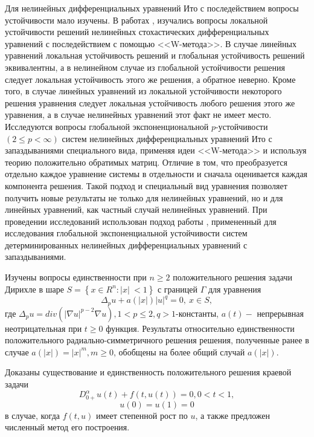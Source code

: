 Для нелинейных дифференциальных уравнений Ито с последействием
вопросы устойчивости мало изучены. В работах \cite{kad5}, \cite{kad6} изучались
вопросы локальной устойчивости решений нелинейных стохастических
дифференциальных уравнений с последействием с помощью <<W-метода>>. В
случае линейных уравнений локальная устойчивость решений и
глобальная устойчивость решений эквивалентны, а в нелинейном случае
из глобальной устойчивости решения следует локальная устойчивость
этого же решения, а обратное неверно. Кроме того, в случае линейных
уравнений из локальной устойчивости некоторого решения уравнения
следует локальная устойчивость любого решения этого же уравнения, а в
случае нелинейных уравнений этот факт не имеет место.
Исследуются вопросы  глобальной
экспоненциональной $p$-устойчи\-вос\-ти $(2 \le p < \infty )$ систем
нелинейных дифференциальных уравнений Ито с запаздываниями
специального вида, применяя идеи <<W-метода>> и  используя теорию
положительно обратимых матриц. Отличие в том, что преобразуется
отдельно каждое уравнение системы в отдельности и сначала
оценивается каждая компонента решения. Такой подход и специальный
вид уравнения позволяет получить новые результаты не только для
нелинейных уравнений, но и для линейных уравнений, как частный
случай нелинейных уравнений. При проведении исследований использован
подход работы \cite{kad7}, примененный для исследования глобальной
экспоненциальной устойчивости систем детерминированных нелинейных
дифференциальных уравнений с запаздываниями.



Изучены вопросы единственности при $ n \geq 2$ положительного решения задачи Дирихле
в шаре
$ S=\left\{x\in R^n:\vert x \vert\ < 1 \right\} $
с границей $\Gamma $
для уравнения
$$
\Delta_{p} u+a(|x|){\vert u \vert}^q=0,\ x \in S,
$$
где $ \Delta_{p} u=div(\vert \nabla u\vert^{p-2}\nabla u),
1<p \le2, q>1 $-константы, $a(t)-$ непрерывная неотрицательная
при $t\geq 0 $ функция.
Результаты
относительно единственности положительного радиально-симметричного
решения решения, полученные ранее в случае
$a(|x|)=|x|^m, m\geq 0 $, обобщены на более общий случай $ a(|x|).$

Доказаны существование и
единственность положительного решения краевой задачи
$$
D_{0+}^{\alpha} u(t)+f(t,u(t) )=0,0<t<1,
$$
$$
u(0)=u(1)=0
$$
в случае, когда $f(t,u)$ имеет степенной рост по $u$, а также предложен
численный метод его построения.
















